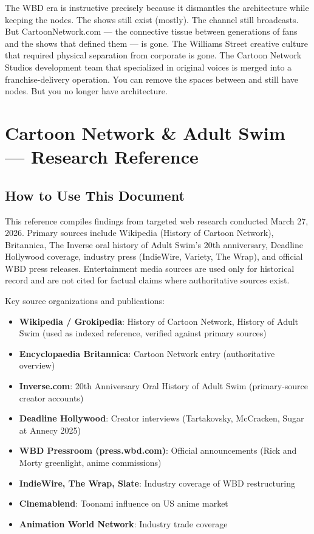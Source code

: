 \documentclass[11pt,letterpaper]{article}
\newcommand{\stageheader}[2]{%
  \noindent\colorbox{#2}{\makebox[\textwidth][l]{%
    \textcolor{white}{\bfseries\sffamily\hspace{6pt}#1\hspace{6pt}}}}%
  \vspace{0.5em}\par%
}
\begin{document}
The WBD era is instructive precisely because it dismantles the architecture while keeping the nodes. The shows still exist (mostly). The channel still broadcasts. But CartoonNetwork.com --- the connective tissue between generations of fans and the shows that defined them --- is gone. The Williams Street creative culture that required physical separation from corporate is gone. The Cartoon Network Studios development team that specialized in original voices is merged into a franchise-delivery operation. You can remove the spaces between and still have nodes. But you no longer have architecture.

\newpage
\stageheader{STAGE 2 --- RESEARCH REFERENCE}{secondary}

\section{Cartoon Network \& Adult Swim --- Research Reference}

\subsection{How to Use This Document}

This reference compiles findings from targeted web research conducted March 27, 2026. Primary sources include Wikipedia (History of Cartoon Network), Britannica, The Inverse oral history of Adult Swim's 20th anniversary, Deadline Hollywood coverage, industry press (IndieWire, Variety, The Wrap), and official WBD press releases. Entertainment media sources are used only for historical record and are not cited for factual claims where authoritative sources exist.

Key source organizations and publications:
\begin{itemize}
  \item \textbf{Wikipedia / Grokipedia}: History of Cartoon Network, History of Adult Swim (used as indexed reference, verified against primary sources)
  \item \textbf{Encyclopaedia Britannica}: Cartoon Network entry (authoritative overview)
  \item \textbf{Inverse.com}: 20th Anniversary Oral History of Adult Swim (primary-source creator accounts)
  \item \textbf{Deadline Hollywood}: Creator interviews (Tartakovsky, McCracken, Sugar at Annecy 2025)
  \item \textbf{WBD Pressroom (press.wbd.com)}: Official announcements (Rick and Morty greenlight, anime commissions)
  \item \textbf{IndieWire, The Wrap, Slate}: Industry coverage of WBD restructuring
  \item \textbf{Cinemablend}: Toonami influence on US anime market
  \item \textbf{Animation World Network}: Industry trade coverage
\end{itemize}
\end{document}
